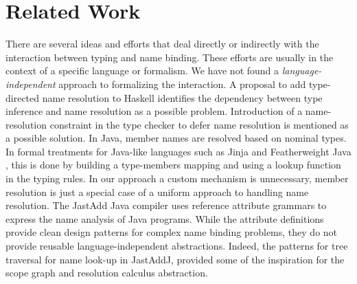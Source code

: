 \section{Related Work}

There are several ideas and efforts that deal directly or indirectly with the
interaction between typing and name binding. These efforts are usually in the
context of a specific language or formalism.
We have not found a \emph{language-independent} approach to formalizing the
interaction.
A proposal to add type-directed name resolution \cite{HaskellTDNR} to Haskell
identifies the dependency between type inference and name resolution as a
possible problem. Introduction of a name-resolution constraint in the type
checker to defer name resolution is mentioned as a possible solution.
In Java, member names are resolved based on nominal types. In formal treatments
for Java-like languages such as Jinja \cite{KleinN06} and Featherweight Java
\cite{IgarashiPW01}, this is done by building a type-members mapping and using a
lookup function in the typing rules. In our approach a custom mechanism is
unnecessary, member resolution is just a special case of a uniform approach to
handling name resolution.
The JastAdd Java compiler \cite{EkmanH06} uses reference attribute grammars to
express the name analysis of Java programs. While the attribute definitions
provide clean design patterns for complex name binding problems, they do not
provide reusable language-independent abstractions. Indeed, the patterns for
tree traversal for name look-up in JastAddJ, provided some of the inspiration
for the scope graph and resolution calculus abstraction.



% 
% 
% 
% 
% 
% 
% 
% 
% 



